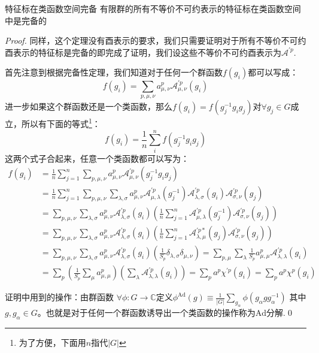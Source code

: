 \begin{theorem}{特征标在类函数空间完备}
	有限群的所有不等价不可约表示的特征标在类函数空间中是完备的
\end{theorem}
\begin{proof}
	同样，这个定理没有酉表示的要求，我们只需要证明对于所有不等价不可约酉表示的特征标是完备的即完成了证明，我们设这些不等价不可约酉表示为$\mathscr{A}^{\prime p}$.
	
	首先注意到根据完备性定理，我们知道对于任何一个群函数$f(g_i)$都可以写成：
	\[f(g_i)=\sum_{p,\mu,\nu}a^p_{\mu,\nu}\mathcal{A}^{\prime p}_{\mu,\nu}(g_i)\]
	进一步如果这个群函数还是一个类函数，那么$f(g_i)=f(g_j^{-1}g_ig_j)$对$\forall g_j\in G$成立，所以有下面的等式\footnote{为了方便，下面用$n$指代$|G|$}：
	\[f(g_i)=\frac{1}{n}\sum_{i}^{n}f(g_j^{-1}g_ig_j)\]
	这两个式子合起来，任意一个类函数都可以写为：
	\begin{equation*}
		\begin{aligned}
			f\left(g_{i}\right) & =\frac{1}{n} \sum_{j=1}^{n} \sum_{p, \mu, \nu} a_{\mu, \nu}^{p} \mathcal{A}_{\mu, \nu}^{\prime p}\left(g_{j}^{-1} g_{i} g_{j}\right) \\
			& =\frac{1}{n} \sum_{j=1}^{n} \sum_{p, \mu, \nu} \sum_{\lambda, \sigma} a_{\mu, \nu}^{p} \mathcal{A}_{\mu, \lambda}^{\prime p}\left(g_{j}^{-1}\right) \mathcal{A}_{\lambda, \sigma}^{\prime p}\left(g_{i}\right) \mathcal{A}_{\sigma, \nu}^{\prime p}\left(g_{j}\right) \\
			& =\sum_{p, \mu, \nu} \sum_{\lambda, \sigma} a_{\mu, \nu}^{p} \mathcal{A}_{\lambda, \sigma}^{\prime p}\left(g_{i}\right)\left(\frac{1}{n} \sum_{j=1}^{n} \mathcal{A}_{\mu, \lambda}^{\prime p}\left(g_{j}^{-1}\right) \mathcal{A}_{\sigma, \nu}^{\prime p}\left(g_{j}\right)\right) \\
			& =\sum_{p, \mu, \nu} \sum_{\lambda, \sigma} a_{\mu, \nu}^{p} \mathcal{A}_{\lambda, \sigma}^{\prime p}\left(g_{i}\right)\left(\frac{1}{n} \sum_{j=1}^{n} \mathcal{A}_{\lambda, \mu}^{\prime p *}\left(g_{j}\right) \mathcal{A}_{\sigma, \nu}^{\prime p}\left(g_{j}\right)\right) \\
			& =\sum_{p, \mu, \nu} \sum_{\lambda, \sigma} a_{\mu, \nu}^{p} \mathcal{A}_{\lambda, \sigma}^{\prime p}\left(g_{i}\right)\left(\frac{1}{S_{p}} \delta_{\lambda, \sigma} \delta_{\mu, \nu}\right)=\sum_{p, \mu} \sum_{\lambda} \frac{1}{S_{p}} a_{\mu, \mu}^{p} \mathcal{A}_{\lambda, \lambda}^{\prime p}\left(g_{i}\right) \\
			& =\sum_{p}\left(\frac{1}{S_{p}} \sum_{\mu} a_{\mu, \mu}^{p}\right)\left(\sum_{\lambda} \mathcal{A}_{\lambda, \lambda}^{\prime p}\left(g_{i}\right)\right)=\sum_{p} a^{p} \chi^{\prime p}\left(g_{i}\right)=\sum_{p} a^{p} \chi^{p}\left(g_{i}\right)
		\end{aligned}
	\end{equation*}
	
	证明中用到的操作：由群函数 $\forall \phi: G \rightarrow \mathbb{C}$定义$\phi^{\mathrm{Ad}}(g) \equiv \frac{1}{|G|} \sum_{g_{\alpha}} \phi\left(g_{\alpha} g g_{\alpha}^{-1}\right)$ 其中$g, g_{\alpha} \in G $。也就是对于任何一个群函数诱导出一个类函数的操作称为$\mathrm{Ad}$分解.\qed
\end{proof}
